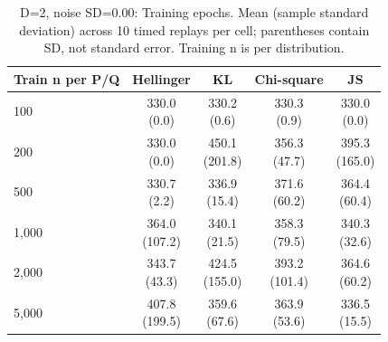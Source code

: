 \begin{table}[t]
\centering
\small
\setlength{\tabcolsep}{4pt}
\caption{D=2, noise SD=0.00: Training epochs. Mean (sample standard deviation) across 10 timed replays per cell; parentheses contain SD, not standard error. Training n is per distribution.}
\label{tab:sim-d-2-noise-sd-0-00-training-epochs}
\begin{tabular}{lcccc}
\toprule
Train n per P/Q & Hellinger & KL & Chi-square & JS \\
\midrule
100 & \shortstack{330.0\\(0.0)} & \shortstack{330.2\\(0.6)} & \shortstack{330.3\\(0.9)} & \shortstack{330.0\\(0.0)} \\
200 & \shortstack{330.0\\(0.0)} & \shortstack{450.1\\(201.8)} & \shortstack{356.3\\(47.7)} & \shortstack{395.3\\(165.0)} \\
500 & \shortstack{330.7\\(2.2)} & \shortstack{336.9\\(15.4)} & \shortstack{371.6\\(60.2)} & \shortstack{364.4\\(60.4)} \\
1,000 & \shortstack{364.0\\(107.2)} & \shortstack{340.1\\(21.5)} & \shortstack{358.3\\(79.5)} & \shortstack{340.3\\(32.6)} \\
2,000 & \shortstack{343.7\\(43.3)} & \shortstack{424.5\\(155.0)} & \shortstack{393.2\\(101.4)} & \shortstack{364.6\\(60.2)} \\
5,000 & \shortstack{407.8\\(199.5)} & \shortstack{359.6\\(67.6)} & \shortstack{363.9\\(53.6)} & \shortstack{336.5\\(15.5)} \\
\bottomrule
\end{tabular}
\end{table}

